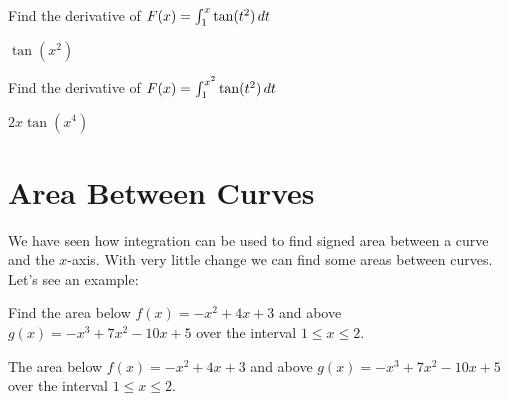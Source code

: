 \begin{exercises}
\begin{exercise} Find the derivative of $F(x)=\int_1^x \tan(t^2)\, d t$
\begin{answer} $\tan(x^2)$
\end{answer}\end{exercise}

\begin{exercise} Find the derivative of $F(x)=\int_1^{x^2} \tan(t^2)\, d t$
\begin{answer} $2x\tan(x^4)$
\end{answer}\end{exercise}

\end{exercises}













\section{Area Between Curves}

We have seen how integration can be used to find signed area between a
curve and the $x$-axis. With very little change we can find some areas
between curves. Let's see an example:

\begin{example} Find the area below $f(x)= -x^2+4x+3$ and above
$g(x)=-x^3+7x^2-10x+5$ over the interval $1\le x\le2$. 
\end{example}

\begin{marginfigure}
\caption{The area below $f(x)= -x^2+4x+3$ and above
$g(x)=-x^3+7x^2-10x+5$ over the interval $1\le x\le2$. }
\label{fig:area between curves}
\end{marginfigure}

